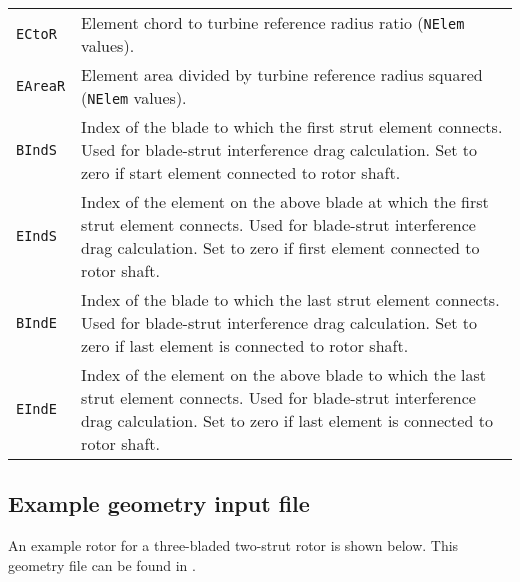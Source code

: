 \begin{longtable}{p{}p{}}
\texttt{ECtoR}   & Element chord to turbine reference radius ratio (\texttt{NElem} values). \\
\texttt{EAreaR}  & Element area divided by turbine reference radius squared (\texttt{NElem} values). \\
\rowcolor{highlightcolor}\texttt{BIndS}   & Index of the blade to which the first strut element connects. Used for blade-strut interference drag calculation. Set to zero if start element connected to rotor shaft. \\
\rowcolor{highlightcolor}\texttt{EIndS}   & Index of the element on the above blade at which the first strut element connects. Used for blade-strut interference drag calculation. Set to zero if first element connected to rotor shaft. \\
\rowcolor{highlightcolor}\texttt{BIndE}   & Index of the blade to which the last strut element connects. Used for blade-strut interference drag calculation. Set to zero if last element is connected to rotor shaft. \\
\rowcolor{highlightcolor}\texttt{EIndE}   & Index of the element on the above blade to which the last strut element connects. Used for blade-strut interference drag calculation. Set to zero if last element is connected to rotor shaft. \\
\bottomrule
\end{longtable}

\subsection{Example geometry input file}
An example rotor for a three-bladed two-strut rotor is shown below. This geometry file can be found in .

